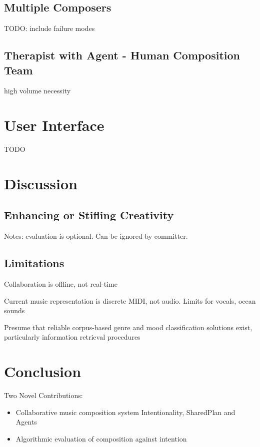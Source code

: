 \documentclass[final,authoryear,11pt,times]{elsarticle}
\begin{document}
\subsection{Multiple Composers}

TODO: include failure modes

\subsection{Therapist with Agent - Human Composition Team}

high volume necessity

\section{User Interface}

TODO

\section{Discussion}

\subsection{Enhancing or Stifling Creativity}

Notes: evaluation is optional. Can be ignored by committer.

\subsection{Limitations}

Collaboration is offline, not real-time

Current music representation is discrete MIDI, not audio. Limits for vocals, ocean sounds

Presume that reliable corpus-based genre and mood classification solutions exist, particularly information retrieval procedures



\section{Conclusion}
 Two Novel Contributions:
 \begin{itemize}
\item Collaborative music composition system 
Intentionality, SharedPlan and Agents
\item Algorithmic evaluation of composition against intention
\end{itemize}
\end{document}
